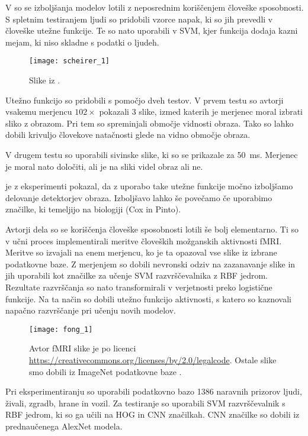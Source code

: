 V \cite{scheirer2014perceptual} so se izboljšanja modelov lotili z neposrednim koriščenjem človeške sposobnosti. S spletnim testiranjem ljudi so pridobili vzorce napak, ki so jih prevedli v človeške utežne funkcije. Te so nato uporabili v SVM, kjer funkcija dodaja kazni mejam, ki niso skladne s podatki o ljudeh.

\begin{figure}[!htbp]
	\centering
	\texttt{[image: scheirer\_1]}
	\caption{Slike iz \cite{jain2010fddb}.}
\end{figure}

Utežno funkcijo so pridobili s pomočjo dveh testov. V prvem testu so avtorji vsakemu merjencu $102\times$ pokazali $3$ slike, izmed katerih je merjenec moral izbrati sliko z obrazom. Pri tem so spreminjali območje vidnosti obraza. Tako so lahko dobili krivuljo človekove natačnosti glede na vidno območje obraza.

V drugem testu so uporabili sivinske slike, ki so se prikazale za \SI{50}{\ms}. Merjenec je moral nato določiti, ali je na sliki videl obraz ali ne.

 je z eksperimenti pokazal, da z uporabo take utežne funkcije močno izboljšamo delovanje detektorjev obraza. Izboljšavo lahko še povečamo če uporabimo značilke, ki temeljijo na biologiji (Cox in Pinto).

Avtorji dela \cite{fong2017using} so se koriščenja človeške sposobnosti lotili še bolj elementarno. Ti so v učni proces implementirali meritve človeških možganskih aktivnosti fMRI. Meritve so izvajali na enem merjencu, ko je ta opazoval vse slike iz izbrane podatkovne baze. Z merjenjem so dobili nevronski odziv na zazanavanje slike in jih uporabili kot značilke za učenje SVM razvrščevalnika z RBF jedrom. Rezultate razvrščanja so nato transformirali v verjetnosti preko logistične funkcije. Na ta način so dobili utežno funkcijo aktivnosti, s katero so kaznovali napačno razvrščanje pri učenju novih modelov.

\begin{figure}[!htbp]
	\centering
	\texttt{[image: fong\_1]}
	\caption{Avtor fMRI slike je \cite{kelley2009fmri} po licenci \url{https://creativecommons.org/licenses/by/2.0/legalcode}. Ostale slike smo dobili iz ImageNet podatkovne baze \cite{deng2009imagenet}.}
\end{figure}


Pri eksperimentiranju so uporabili podatkovno bazo \num{1386} naravnih prizorov ljudi, živali, zgradb, hrane in vozil. Za testiranje so uporabili SVM razvrščevalnik s RBF jedrom, ki so ga učili na HOG in CNN značilkah. CNN značilke so dobili iz prednaučenega AlexNet modela.

